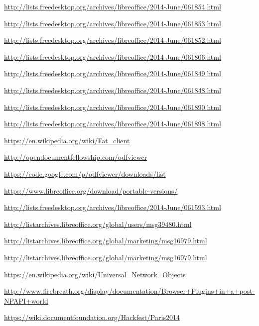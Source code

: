 \documentclass{article}
\begin{document}
\begin{thebibliography}{30}
    \url{http://lists.freedesktop.org/archives/libreoffice/2014-June/061854.html}

    \url{http://lists.freedesktop.org/archives/libreoffice/2014-June/061853.html}

    \url{http://lists.freedesktop.org/archives/libreoffice/2014-June/061852.html}

    \url{http://lists.freedesktop.org/archives/libreoffice/2014-June/061806.html}

    \url{http://lists.freedesktop.org/archives/libreoffice/2014-June/061849.html}

    \url{http://lists.freedesktop.org/archives/libreoffice/2014-June/061848.html}

    \url{http://lists.freedesktop.org/archives/libreoffice/2014-June/061890.html}

    \url{http://lists.freedesktop.org/archives/libreoffice/2014-June/061898.html}

    \url{https://en.wikipedia.org/wiki/Fat_client}

    \url{http://opendocumentfellowship.com/odfviewer}

    \url{https://code.google.com/p/odfviewer/downloads/list}

    \url{https://www.libreoffice.org/download/portable-versions/}

    \url{http://lists.freedesktop.org/archives/libreoffice/2014-June/061593.html}

    \url{http://listarchives.libreoffice.org/global/users/msg39480.html}

    \url{http://listarchives.libreoffice.org/global/marketing/msg16979.html}

    \url{http://listarchives.libreoffice.org/global/marketing/msg16979.html}

    \url{https://en.wikipedia.org/wiki/Universal_Network_Objects}

    \url{http://www.firebreath.org/display/documentation/Browser+Plugins+in+a+post-NPAPI+world}

    \url{https://wiki.documentfoundation.org/Hackfest/Paris2014}


\end{thebibliography}
\end{document}

